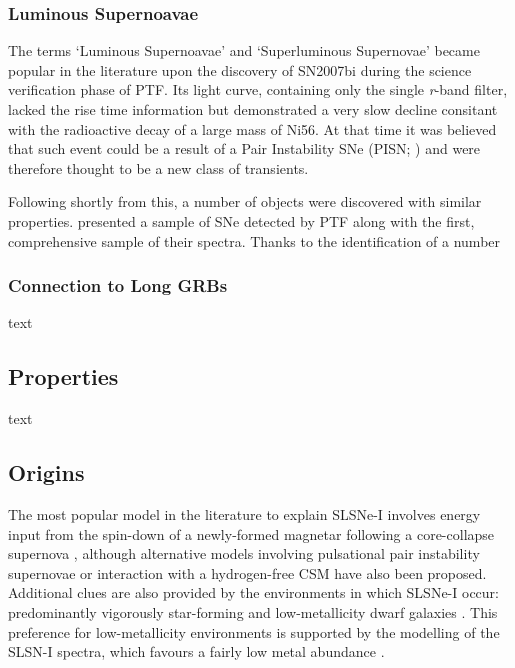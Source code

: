 \subsubsection{Luminous Supernoavae}
The terms `Luminous Supernoavae' and `Superluminous Supernovae' became popular in the literature upon the discovery of SN2007bi \citep{Gal-Yam2009} during the science verification phase of PTF. Its light curve, containing only the single \textit{r}-band filter, lacked the rise time information but demonstrated a very slow decline consitant with the radioactive decay of a large mass of Ni56. At that time it was believed that such event could be a result of a Pair Instability SNe (PISN; ) and were therefore thought to be a new class of transients.

Following shortly from this, a number of objects were discovered with similar properties. \citet{Quimby2009} presented a sample of SNe detected by PTF along with the first, comprehensive sample of their spectra. Thanks to the identification of a number

\subsubsection{Connection to Long GRBs}
text

\subsection{Properties}
text

\subsection{Origins} \label{sec:Origins}
The most popular model in the literature to explain SLSNe-I involves
energy input from the spin-down of a newly-formed magnetar following a
core-collapse supernova
\citep{2010ApJ...717..245K,2010ApJ...719L.204W,2013ApJ...770..128I},
although alternative models involving pulsational pair instability
supernovae \citep{2007Natur.450..390W,2015ApJ...814..108Y} or
interaction with a hydrogen-free CSM
\citep{2011ApJ...729L...6C,2013ApJ...773...76C,2015arXiv151000834S}
have also been proposed. Additional clues are also provided by the
environments in which SLSNe-I occur: predominantly vigorously
star-forming and low-metallicity dwarf galaxies \citep[e.g.,][]{2014ApJ...787..138L,2015MNRAS.449..917L,2016arXiv160504925C}. This preference for low-metallicity
environments is supported by the modelling of the SLSN-I spectra,
which favours a fairly low metal abundance
\citep{2016MNRAS.458.3455M}.

